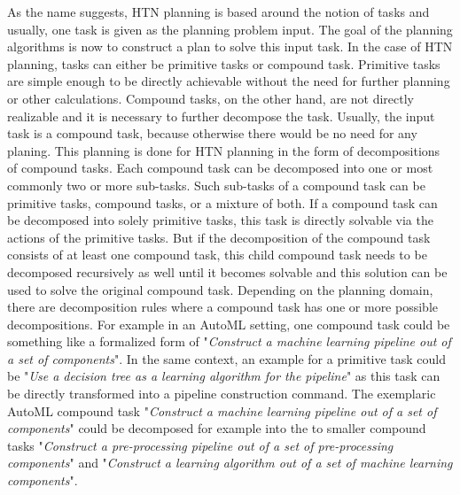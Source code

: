 As the name suggests, HTN planning is based around the notion of tasks and usually, one task is given as the planning problem input.
The goal of the planning algorithms is now to construct a plan to solve this input task.
In the case of HTN planning, tasks can either be primitive tasks or compound task.\newline
Primitive tasks are simple enough to be directly achievable without the need for further planning or other calculations.
Compound tasks, on the other hand, are not directly realizable and it is necessary to further decompose the task.
Usually, the input task is a compound task, because otherwise there would be no need for any planing.
This planning is done for HTN planning in the form of decompositions of compound tasks.\newline
Each compound task can be decomposed into one or most commonly two or more sub-tasks.
Such sub-tasks of a compound task can be primitive tasks, compound tasks, or a mixture of both.
If a compound task can be decomposed into solely primitive tasks, this task is directly solvable via the actions of the primitive tasks.
But if the decomposition of the compound task consists of at least one compound task, this child compound task needs to be decomposed recursively as well until it becomes solvable and this solution can be used to solve the original compound task.
Depending on the planning domain, there are decomposition rules where a compound task has one or more possible decompositions.\newline
For example in an AutoML setting, one compound task could be something like a formalized form of "\textit{Construct a machine learning pipeline out of a set of components}".
In the same context, an example for a primitive task could be "\textit{Use a decision tree as a learning algorithm for the pipeline}" as this task can be directly transformed into a pipeline construction command.
The exemplaric AutoML compound task "\textit{Construct a machine learning pipeline out of a set of components}" could be decomposed for example into the to smaller compound tasks "\textit{Construct a pre-processing pipeline out of a set of pre-processing components}" and "\textit{Construct a learning algorithm out of a set of machine learning components}".

